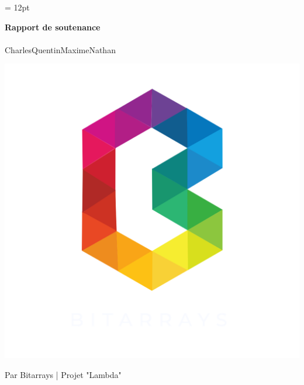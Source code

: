 \documentclass{article}
\begin{document}
    \headsep = 12pt
		\begin{center}
			\begin{LARGE}
				\textbf{Rapport de soutenance}
				\paragraph{}Charles\hspace{0.7cm}Quentin\hspace{0.7cm}Maxime\hspace{0.7cm}Nathan
			\end{LARGE}
		\end{center}
		\vspace{1.5cm}
		\begin{center}
			\includegraphics[scale=0.3]{LogoBitarrays.png}
		\end{center}
		\begin{center}
			\par Par Bitarrays | Projet "Lambda"
		\end{center}
	
	\newpage
    \pagestyle{fancy}
    \fancyhf{}
    
    \cfoot{\thepage}
	\tableofcontents
    
\end{document}

